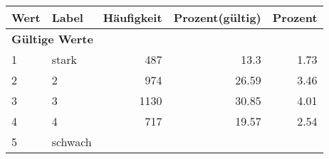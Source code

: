      \begin{longtable}{lXrrr}
     \toprule
     \textbf{Wert} & \textbf{Label} & \textbf{Häufigkeit} & \textbf{Prozent(gültig)} & \textbf{Prozent} \\
     \endhead
     \midrule
     \multicolumn{5}{l}{\textbf{Gültige Werte}}\\

     1 &
     \multicolumn{1}{X}{ stark   } &


       \num{487} &
       \num[round-mode=places,round-precision=2]{13,3} &
         \num[round-mode=places,round-precision=2]{1,73} \\

     2 &
     \multicolumn{1}{X}{ 2   } &


       \num{974} &
       \num[round-mode=places,round-precision=2]{26,59} &
         \num[round-mode=places,round-precision=2]{3,46} \\

     3 &
     \multicolumn{1}{X}{ 3   } &


       \num{1130} &
       \num[round-mode=places,round-precision=2]{30,85} &
         \num[round-mode=places,round-precision=2]{4,01} \\

     4 &
     \multicolumn{1}{X}{ 4   } &


       \num{717} &
       \num[round-mode=places,round-precision=2]{19,57} &
         \num[round-mode=places,round-precision=2]{2,54} \\

     5 &
     \multicolumn{1}{X}{ schwach   } &



\end{longtable}
